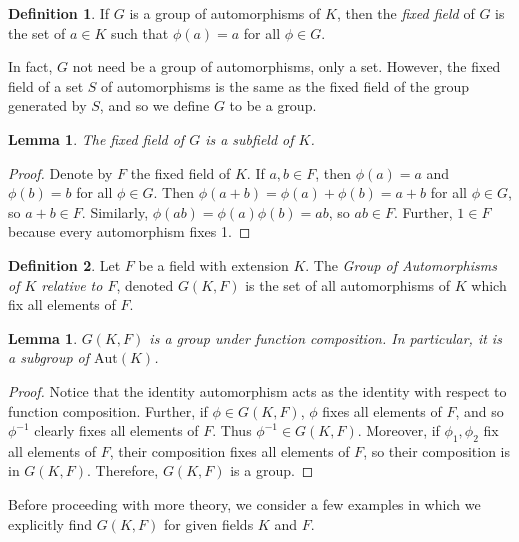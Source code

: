 \documentclass[12pt,leqno]{article}
\numberwithin{equation}{section}
\theoremstyle{plain}
\newtheorem{lem}[thm]{Lemma}
\theoremstyle{definition}
\newtheorem*{Def}{Definition}
\theoremstyle{remark}
\begin{document}
\begin{Def}
 If $G$ is a group of automorphisms of $K$, then the \textit{fixed field} of $G$ is the set of $a\in K$ such that $\phi(a)=a$ for all $\phi\in G$.
\end{Def}

In fact, $G$ not need be a group of automorphisms, only a set. However, the fixed field of a set $S$ of automorphisms is the same as the fixed field of the group generated by $S$, and so we define $G$ to be a group. 

\begin{lem}
 The fixed field of $G$ is a subfield of $K$.
\end{lem}

\begin{proof}
 Denote by $F$ the fixed field of $K$. If $a,b\in F$, then $\phi(a)=a$ and $\phi(b)=b$ for all $\phi\in G$. Then $\phi(a+b)=\phi(a)+\phi(b)=a+b$ for all $\phi\in G$, so $a+b\in F$. Similarly, $\phi(ab)=\phi(a)\phi(b)=ab$, so $ab\in F$. Further, $1\in F$ because every automorphism fixes 1.
\end{proof}

\begin{Def}
 Let $F$ be a field with extension $K$. The \textit{Group of Automorphisms of $K$ relative to $F$}, denoted $G(K,F)$ is the set of all automorphisms of $K$ which fix all elements of $F$.
\end{Def}

\begin{lem}
 $G(K,F)$ is a group under function composition. In particular, it is a subgroup of $\text{Aut}(K)$.
\end{lem}

\begin{proof}
Notice that the identity automorphism acts as the identity with respect to function composition. Further, if $\phi\in G(K,F)$, $\phi$ fixes all elements of $F$, and so $\phi^{-1}$ clearly fixes all elements of $F$. Thus $\phi^{-1}\in G(K,F)$. Moreover, if $\phi_1,\phi_2$ fix all elements of $F$, their composition fixes all elements of $F$, so their composition is in $G(K,F)$. Therefore, $G(K,F)$ is a group.
\end{proof}

Before proceeding with more theory, we consider a few examples in which we explicitly find $G(K,F)$ for given fields $K$ and $F$.
\end{document}
